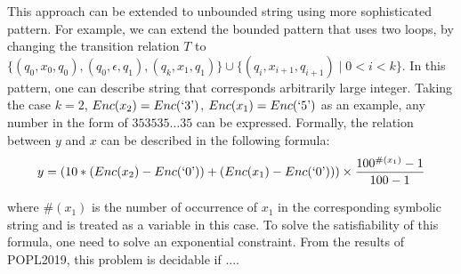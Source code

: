 \documentclass{llncs}
\begin{document}

This approach can be extended to unbounded string using more sophisticated pattern. For example, we can extend the bounded pattern that uses two loops, by changing the transition relation $T$ to $\{(q_0,x_0,q_0), (q_0,\epsilon,q_1), (q_k,x_1,q_1)\} \cup \{(q_i,x_{i+1},q_{i+1})\mid 0< i <k\}$. In this pattern, one can describe string that corresponds arbitrarily large integer. Taking the case $k=2$, $Enc(x_2)=Enc(\mbox{`3'})$, $Enc(x_1)=Enc(\mbox{`5'})$ as an example, any number in the form of $353535\ldots35$ can be expressed. Formally, the relation between $y$ and $x$ can be described in the following formula:
$$y= (10*(Enc(x_2)-Enc(\mbox{`0'}))+(Enc(x_1)-Enc(\mbox{`0'})))\times \frac{100^{\#(x_1)}-1}{100-1}$$

where $\#(x_1)$ is the number of occurrence of $x_1$ in the corresponding symbolic string and is treated as a variable in this case. To solve the satisfiability of this formula, one need to solve an exponential constraint. From the results of POPL2019, this problem is decidable if ....
\end{document}
